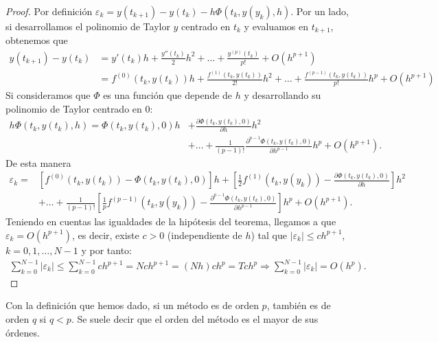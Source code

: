 \begin{proof}
Por definición $\varepsilon_k = y(t_{k+1}) - y(t_k) - h\Phi(t_k,y(y_k),h)$.  Por un lado, si desarrollamos el polinomio de Taylor $y$ centrado en $t_k$ y evaluamos en $t_{k+1}$, obtenemos que
\begin{align*}
    y(t_{k+1}) - y(t_k) &= y'(t_k)h + \frac{y''(t_k)}{2}h^2 + \ldots + \frac{y^{(p)}(t_k)}{p!} + O(h^{p+1}) \\
    & = f^{(0)}(t_k,y(t_k))h + \frac{f^{(1)}(t_k,y(t_k))}{2!}h^2 + \ldots + \frac{f^{(p-1)}(t_k,y(t_k))}{p!}h^p + O(h^{p+1})
\end{align*}
Si consideramos que $\Phi$ es una función que depende de $h$ y desarrollando su polinomio de Taylor centrado en $0$:
\begin{align*}
    h\Phi(t_k,y(t_k),h) = \Phi(t_k,y(t_k),0)h &+ \frac{\partial \Phi(t_k,y(t_k),0)}{\partial h}h^2 \\&+ \ldots + \frac{1}{(p-1)!}\frac{\partial^{p-1} \Phi(t_k,y(t_k),0)}{\partial h^{p-1}}h^p + O(h^{p+1}) .
\end{align*}
De esta manera
\begin{align*}
    \varepsilon_k = & [f^{(0)}(t_k,y(t_k)) - \Phi(t_k,y(t_k),0)]h + \left[\frac{1}{2}f^{(1)}(t_k,y(y_k)) - \frac{\partial \Phi(t_k,y(t_k),0)}{\partial h}  \right]h^2 \\
    & +\ldots + \frac{1}{(p-1)!} \left[\frac{1}{p}f^{(p-1)}(t_k,y(y_k)) - \frac{\partial^{p-1} \Phi(t_k,y(t_k),0)}{\partial h^{p-1}}\right]h^p + O(h^{p+1}).
\end{align*}
Teniendo en cuentas las igualdades de la hipótesis del teorema, llegamos a que $\varepsilon_k = O(h^{p+1})$, es decir, existe $c > 0$ (independiente de $h$) tal que $|\varepsilon_k| \leq ch^{p+1}$, $k=0,1,\ldots,N-1$ y por tanto:
\begin{align*}
    \sum_{k=0}^{N-1} |\varepsilon_k| \leq \sum_{k=0}^{N-1} ch^{p+1} = Nch^{p+1} = (Nh)ch^p = Tch^p \Longrightarrow\sum_{k=0}^{N-1} |\varepsilon_k| = O(h^p).
\end{align*}
\end{proof}

\begin{obs}
Con la definición que hemos dado, si un método es de orden $p$, también es de orden $q$ si $q < p$. Se suele decir que el orden del método es el mayor de sus órdenes.
\end{obs}

